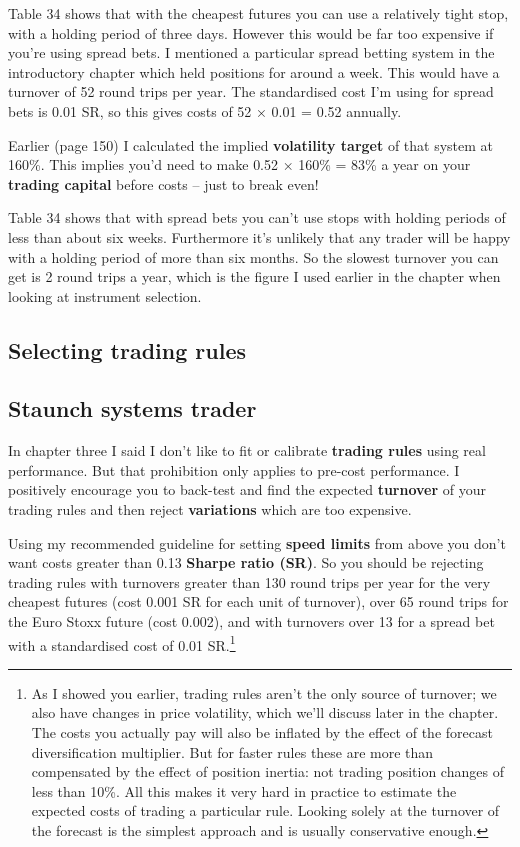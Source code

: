 Table 34 shows that with the cheapest futures you can use a relatively tight stop, with a holding period of three days. However this would be far too expensive if you're using spread bets. I mentioned a particular spread betting system in the introductory chapter which held positions for around a week. This would have a turnover of 52 round trips per year. The standardised cost I'm using for spread bets is 0.01 SR, so this gives costs of 52 × 0.01 = 0.52 annually.

Earlier (page 150) I calculated the implied \textbf{volatility target} of that system at 160\%. This implies you'd need to make 0.52 × 160\% = 83\% a year on your \textbf{trading capital} before costs -- just to break even!

Table 34 shows that with spread bets you can't use stops with holding periods of less than about six weeks. Furthermore it's unlikely that any trader will be happy with a holding period of more than six months. So the slowest turnover you can get is 2 round trips a year, which is the figure I used earlier in the chapter when looking at instrument selection.

\subsection*{Selecting trading rules}

\subsection*{Staunch systems trader}

In chapter three I said I don't like to fit or calibrate \textbf{trading rules} using real performance. But that prohibition only applies to pre-cost performance. I positively encourage you to back-test and find the expected \textbf{turnover} of your trading rules and then reject \textbf{variations} which are too expensive.

Using my recommended guideline for setting \textbf{speed limits} from above you don't want costs greater than 0.13 \textbf{Sharpe ratio (SR)}. So you should be rejecting trading rules with turnovers greater than 130 round trips per year for the very cheapest futures (cost 0.001 SR for each unit of turnover), over 65 round trips for the Euro Stoxx future (cost 0.002), and with turnovers over 13 for a spread bet with a standardised cost of 0.01 SR.\footnote{As I showed you earlier, trading rules aren’t the only source of turnover; we also have changes in price volatility, which we’ll discuss later in the chapter. The costs you actually pay will also be inflated by the effect of the forecast diversification multiplier. But for faster rules these are more than compensated by the effect of position inertia: not trading position changes of less than 10\%. All this makes it very hard in practice to estimate the expected costs of trading a particular rule. Looking solely at the turnover of the forecast is the simplest approach and is usually conservative enough.}

